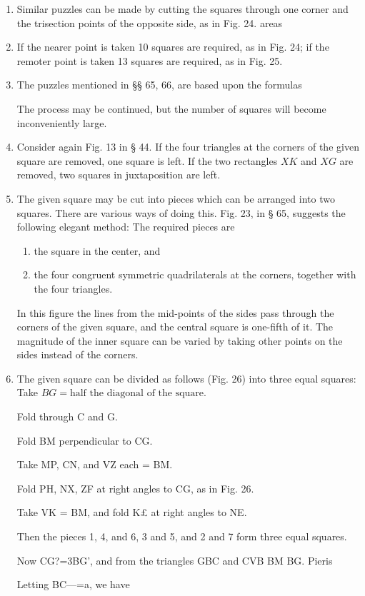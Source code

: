 \begin{enumerate}
    \item Similar puzzles can be made by cutting the squares through one corner
        and the trisection points of the opposite side, as in Fig.  24.  areas

    \item If the nearer point is taken 10 squares are required, as in Fig. 24;
        if the remoter point is taken 13 squares are required, as in Fig. 25.  

    \item The puzzles mentioned in §§ 65, 66, are based upon the formulas


        The process may be continued, but the number of squares will become
        inconveniently large.

    \item Consider again Fig. 13 in § 44. If the four triangles at the corners
        of the given square are removed, one square is left. If the two
        rectangles $XK$ and $XG$ are removed, two squares in juxtaposition are
        left.

    \item The given square may be cut into pieces which can be arranged into two
        squares.  There are various ways of doing this. Fig. 23, in § 65,
        suggests the following elegant method: The required pieces are 

        \begin{enumerate}[(1)]
            \item the square in the center, and 
            \item the four congruent symmetric quadrilaterals at the corners,
                together with the four triangles. 
        \end{enumerate}
    
        In this figure the lines from the mid-points of the sides pass through
        the corners of the given square, and the central square is one-fifth of
        it. The magnitude of the inner square can be varied by taking other
        points on the sides instead of the corners.

    \item The given square can be divided as follows (Fig. 26) into three equal
        squares: Take $BG = \text{half the diagonal of the square}$.


    Fold through C and G.

    Fold BM perpendicular to CG.

    Take MP, CN, and VZ each = BM.
    
    Fold PH, NX, ZF at right angles to CG, as in Fig. 26.
    
    Take VK = BM, and fold K£ at right angles to NE.
    
    Then the pieces 1, 4, and 6, 3 and 5, and 2 and 7 form three equal squares.
    
    Now CG?=3BG’, and from the triangles GBC and CVB BM BG.  Pieris
    
    Letting BC—=a, we have
    
\end{enumerate}

